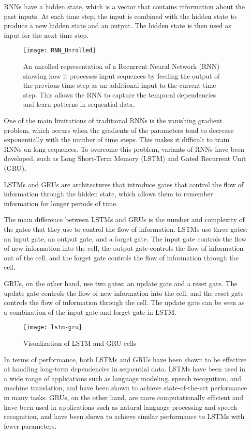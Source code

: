 RNNs have a hidden state, which is a vector that contains information about the past inputs.
At each time step, the input is combined with the hidden state to produce a new hidden state and an output.
The hidden state is then used as input for the next time step.

\begin{figure}[H]
  \centering
  \texttt{[image: RNN\_Unrolled]}
  \caption{An unrolled representation of a Recurrent Neural Network (RNN) showing how it processes input sequences by feeding the output of the previous time step as an additional input to the current time step. This allows the RNN to capture the temporal dependencies and learn patterns in sequential data.\cite{RNN:Unrolled}}
\end{figure}

One of the main limitations of traditional RNNs is the vanishing gradient problem, which occurs when the gradients of the parameters tend to decrease exponentially with the number of time steps.
This makes it difficult to train RNNs on long sequences.
To overcome this problem, variants of RNNs have been developed, such as Long Short-Term Memory (LSTM) and Gated Recurrent Unit (GRU).

LSTMs and GRUs are architectures that introduce gates that control the flow of information through the hidden state, which allows them to remember information for longer periods of time. 

The main difference between LSTMs and GRUs is the number and complexity of the gates that they use to control the flow of information.
LSTMs use three gates: an input gate, an output gate, and a forget gate.
The input gate controls the flow of new information into the cell, the output gate controls the flow of information out of the cell, and the forget gate controls the flow of information through the cell.

GRUs, on the other hand, use two gates: an update gate and a reset gate.
The update gate controls the flow of new information into the cell, and the reset gate controls the flow of information through the cell.
The update gate can be seen as a combination of the input gate and forget gate in LSTM.

\begin{figure}[H]
  \centering
  \texttt{[image: lstm-gru]}
  \caption{Visualization of LSTM and GRU cells \cite{phi}}
\end{figure}

In terms of performance, both LSTMs and GRUs have been shown to be effective at handling long-term dependencies in sequential data.
LSTMs have been used in a wide range of applications such as language modeling, speech recognition, and machine translation, and have been shown to achieve state-of-the-art performance in many tasks.
GRUs, on the other hand, are more computationally efficient and have been used in applications such as natural language processing and speech recognition, and have been shown to achieve similar performance to LSTMs with fewer parameters.

